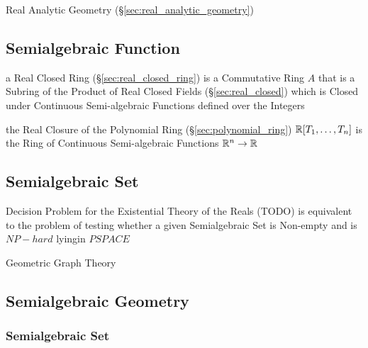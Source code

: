 Real Analytic Geometry (\S\ref{sec:real_analytic_geometry})



\subsection{Semialgebraic Function}\label{sec:semialgebraic_function}

a Real Closed Ring (\S\ref{sec:real_closed_ring}) is a Commutative Ring $A$
that is a Subring of the Product of Real Closed Fields
(\S\ref{sec:real_closed}) which is Closed under Continuous Semi-algebraic
Functions defined over the Integers

the Real Closure of the Polynomial Ring (\S\ref{sec:polynomial_ring})
$\mathbb{R}[T_1,\ldots,T_n]$ is the Ring of Continuous Semi-algebraic Functions
$\mathbb{R}^n \rightarrow \mathbb{R}$



\subsection{Semialgebraic Set}\label{sec:semialgebraic_set}

Decision Problem for the Existential Theory of the Reals (TODO) is equivalent
to the problem of testing whether a given Semialgebraic Set is Non-empty and is
$NP-hard$ lyingin $PSPACE$

Geometric Graph Theory



\subsection{Semialgebraic Geometry}\label{sec:semialgebraic_geometry}

\subsubsection{Semialgebraic Set}\label{sec:semialgebraic_set}



